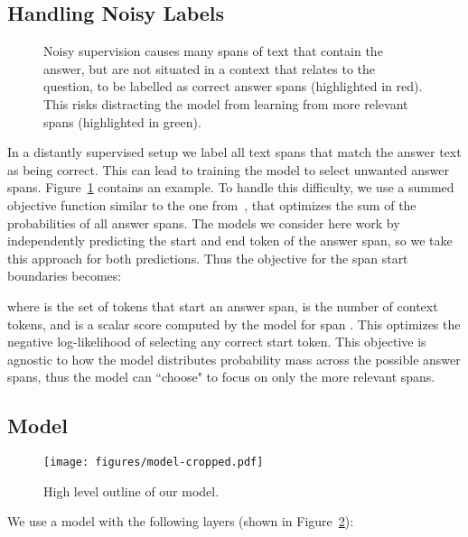 \documentclass[11pt,a4paper]{article}
\begin{document}
\subsection{Handling Noisy Labels}
\label{sect:noisy-labels}
\begin{figure}[h]
\center
{}
\caption{Noisy supervision causes many spans of text that contain the answer, but are not situated in a context that relates to the question, to be labelled as correct answer spans (highlighted in red). This risks distracting the model from learning from more relevant spans (highlighted in green).}
\label{fig:noisy_labels}
\end{figure}

In a distantly supervised setup we label all text spans that match the answer text as being correct. This can lead to training the model to select unwanted answer spans. Figure~\ref{fig:noisy_labels} contains an example. 
To handle this difficulty, we use a summed objective function similar to the one from~\citet{kadlec2016text}, that optimizes the sum of the probabilities of all answer spans. The models we consider here work by independently predicting the start and end token of the answer span, so we take this approach for both predictions. Thus the objective for the span start boundaries becomes:

where  is the set of tokens that start an answer span,  is the number of context tokens, and  is a scalar score computed by the model for span . This optimizes the negative log-likelihood of selecting any correct start token. 
This objective is agnostic to how the model distributes probability mass across the possible answer spans, thus the model can ``choose" to focus on only the more relevant spans. 

\subsection{Model}
\begin{figure}[!ht]
\center
\texttt{[image: figures/model-cropped.pdf]}

\caption{High level outline of our model.}
\label{fig:model_outline}
\end{figure}
We use a model with the following layers (shown in Figure~\ref{fig:model_outline}):
\end{document}
